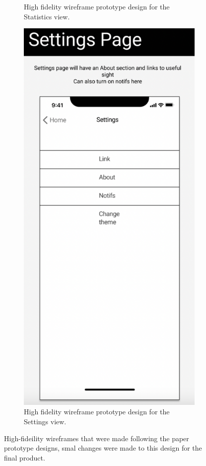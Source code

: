 \documentclass{l4proj}
\begin{document}
\begin{appendices}
\begin{figure}[H]
\begin{subfigure}[b]{0.3\textwidth}
        \caption{High fidelity wireframe prototype design for the Statistics view.}
        \label{fig:StatsWireframe}
    \end{subfigure} 
    \begin{subfigure}[b]{0.3\textwidth}
        \includegraphics[scale=0.3]{images/SettingsWireframe.pdf}
        \caption{High fidelity wireframe prototype design for the Settings view.}
        \label{fig:SettingsWireframe}
    \end{subfigure}   
    \caption{High-fideility wireframes that were made following the paper prototype designs, smal changes were made to this design for the final product.}
    \label{fig:HighFidWireframes}
\end{figure}


\end{appendices}
\end{document}
